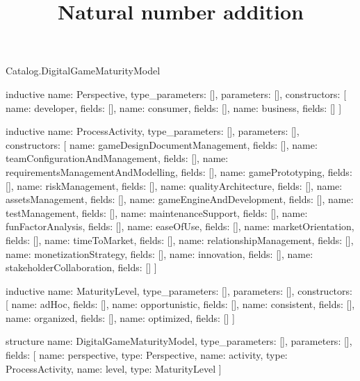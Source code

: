 \begin{lexlean}{Catalog.DigitalGameMaturityModel}
\title{Natural number addition}
\begin{semanticmodule}
inductive{
  name: Perspective,
  type_parameters: [],
  parameters: [],
  constructors: [
    {name: developer, fields: []},
    {name: consumer, fields: []},
    {name: business, fields: []}
  ]
}

inductive{
  name: ProcessActivity,
  type_parameters: [],
  parameters: [],
  constructors: [
    {name: gameDesignDocumentManagement, fields: []},
    {name: teamConfigurationAndManagement, fields: []},
    {name: requirementsManagementAndModelling, fields: []},
    {name: gamePrototyping, fields: []},
    {name: riskManagement, fields: []},
    {name: qualityArchitecture, fields: []},
    {name: assetsManagement, fields: []},
    {name: gameEngineAndDevelopment, fields: []},
    {name: testManagement, fields: []},
    {name: maintenanceSupport, fields: []},
    {name: funFactorAnalysis, fields: []},
    {name: easeOfUse, fields: []},
    {name: marketOrientation, fields: []},
    {name: timeToMarket, fields: []},
    {name: relationshipManagement, fields: []},
    {name: monetizationStrategy, fields: []},
    {name: innovation, fields: []},
    {name: stakeholderCollaboration, fields: []}
  ]
}

inductive{
  name: MaturityLevel,
  type_parameters: [],
  parameters: [],
  constructors: [
    {name: adHoc, fields: []},
    {name: opportunistic, fields: []},
    {name: consistent, fields: []},
    {name: organized, fields: []},
    {name: optimized, fields: []}
  ]
}

structure{
  name: DigitalGameMaturityModel,
  type_parameters: [],
  parameters: [],
  fields: [
    {name: perspective, type: Perspective},
    {name: activity, type: ProcessActivity},
    {name: level, type: MaturityLevel}
  ]
}
\end{semanticmodule}
\end{lexlean}
